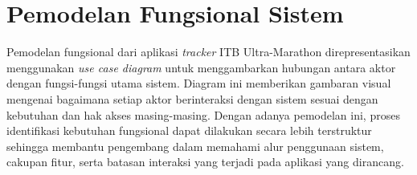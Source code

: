 

\section{Pemodelan Fungsional Sistem}
Pemodelan fungsional dari aplikasi \textit{tracker} ITB Ultra-Marathon
direpresentasikan menggunakan \textit{use case diagram} untuk menggambarkan
hubungan antara aktor dengan fungsi-fungsi utama sistem. Diagram ini memberikan
gambaran visual mengenai bagaimana setiap aktor berinteraksi dengan sistem
sesuai dengan kebutuhan dan hak akses masing-masing. Dengan adanya pemodelan
ini, proses identifikasi kebutuhan fungsional dapat dilakukan secara lebih
terstruktur sehingga membantu pengembang dalam memahami alur penggunaan sistem,
cakupan fitur, serta batasan interaksi yang terjadi pada aplikasi yang
dirancang.

